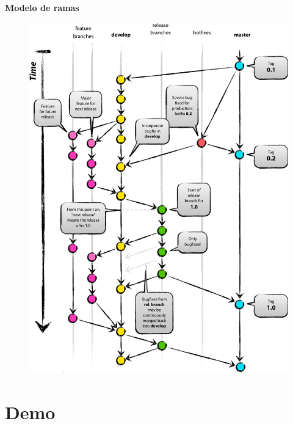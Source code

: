 \documentclass[11pt]{beamer}
\begin{document}
\begin{frame}{\textbf{\LARGE{Modelo de ramas}}}
	\vspace{-.7cm}
	\begin{figure}[H]
		{\includegraphics[height=.8\textheight]{./imagenes/Git-branching-model.pdf}}
	\end{figure}	
\end{frame}

\section{Demo}
\end{document}
